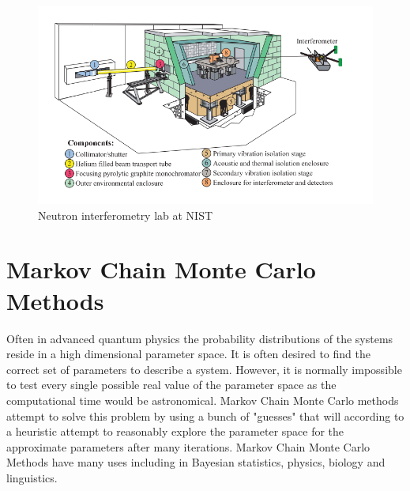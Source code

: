 \begin{figure}[ht!]
\centering
\includegraphics[scale=0.5]{Figures/neutroninterferometer.png}
\caption{Neutron interferometry lab at NIST \cite{dimaThesis}}
\label{fig:neutroninterferometerlab}
\end{figure}
\section{Markov Chain Monte Carlo Methods}
Often in advanced quantum physics the probability distributions of the systems reside in a high dimensional parameter space. It is often desired to find the correct set of parameters to describe a system. However, it is normally impossible to test every single possible real value of the parameter space as the computational time would be astronomical. Markov Chain Monte Carlo methods attempt to solve this problem by using a bunch of "guesses" that will according to a heuristic attempt to reasonably explore the parameter space for the approximate parameters after many iterations.  Markov Chain Monte Carlo Methods have many uses including in Bayesian statistics, physics, biology and linguistics.\cite{mcmc}

